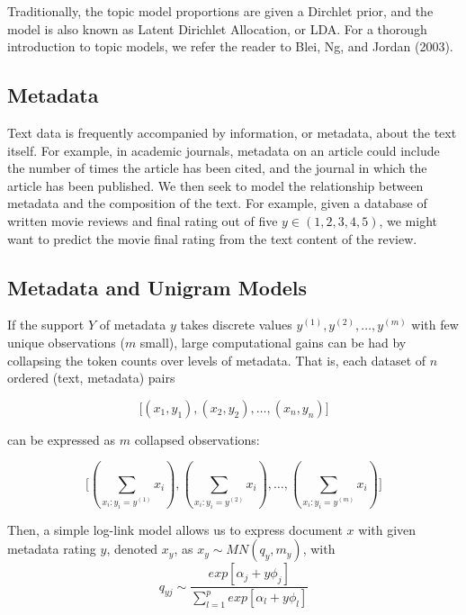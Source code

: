 \documentclass[12pt]{article}
\begin{document}
Traditionally, the topic model proportions are given a Dirchlet prior, and the model is also known as Latent Dirichlet Allocation, or LDA. 
For a thorough introduction to topic models, we refer the reader to Blei, Ng, and Jordan (2003). 

\subsection{Metadata}\label{metadata}

Text data is frequently accompanied by information, or metadata, about
the text itself. For example, in academic journals, metadata on an
article could include the number of times the article has been cited,
and the journal in which the article has been published. We then seek to model the relationship between metadata
and the composition of the text. For example, given a database of
written movie reviews and final rating out of five $y \in (1,2,3,4,5)$,
we might want to predict the movie final rating from the text content of the review.

\subsection{Metadata and Unigram Models}

If the support $Y$ of metadata $y$ takes discrete values $y^{(1)}, y^{(2)}, \dots, y^{(m)}$ with few unique observations ($m$ small), large computational gains can be had by collapsing the token counts over levels of metadata.  That is, each dataset of $n$ ordered (text, metadata) pairs

\begin{equation}
\big[ (x_1,y_1), (x_2,y_2), \dots , (x_n,y_n) \big]
\end{equation}

can be expressed as $m$ collapsed observations:

\begin{equation}
\big[  (\sum_{x_i : y_i = y^{(1)}}{x_i}) , (\sum_{x_i : y_i = y^{(2)}}{x_i}), \dots,  (\sum_{x_i : y_i = y^{(m)}}{x_i})  \big]
\end{equation}

Then, a simple log-link model allows us to express document $x$ with given metadata rating $y$,
denoted $x_y$, as $x_y \sim MN(q_y,m_y)$, with
\begin{equation}
q_{yj} \sim \frac{exp[\alpha_j + y \phi_j]}{\sum_{l=1}^{p} exp[\alpha_l + y \phi_l]}
\end{equation}
\end{document}
